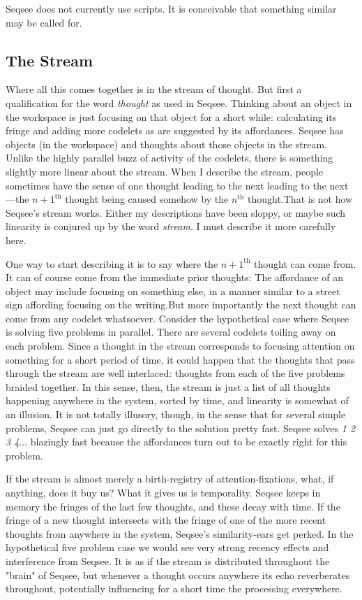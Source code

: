 \documentclass[letterpaper]{article}
\begin{document}
Seqsee does not currently use scripts.  It is conceivable that something similar may be called for. 

\subsection{The Stream}
\label{sec:stream}

Where all this comes together is in the stream of thought. But first a qualification for the word \emph{thought} as used in Seqsee. Thinking about an object in the workspace is just focusing on that object for a short while: calculating its fringe and adding more codelets as are suggested by its affordances. Seqsee has objects (in the workspace) and thoughts about those objects in the stream.  Unlike the highly parallel buzz of activity of the codelets, there is something slightly more linear about the stream.  When I describe the stream, people sometimes have the sense of one thought leading to the next leading to the next---the $n+1^{\mathrm{th}}$ thought being caused somehow by the $n^\mathrm{th}$ thought.That is not how Seqsee's stream works. Either my descriptions have been sloppy, or maybe such linearity is conjured up by the word \emph{stream}. I must describe it more carefully here.

One way to start describing it is to say where the $n+1^{\mathrm{th}}$ thought can come from.  It can of course come  from the immediate prior thoughts: The affordance of an object may include focusing on something else, in a manner similar to a street sign affording focusing on the writing.But more importantly the next thought can come from any codelet whatsoever.  Consider the hypothetical case where Seqsee is solving five problems in parallel.  There are several codelets toiling away on each problem.  Since a thought in the stream corresponds to focusing attention on something for a short period of time, it could happen that the thoughts that pass through the stream are well interlaced: thoughts from each of the five problems braided together. In this sense, then, the stream is just a list of all thoughts happening anywhere in the system, sorted by time, and linearity is somewhat of an illusion. It is not totally illusory, though, in the sense that for several simple problems, Seqsee can just go directly to the solution pretty fast. Seqsee solves \emph{1 2 3 4$\ldots$} blazingly fast because the affordances turn out to be exactly right for this problem.

If the stream is almost merely a birth-registry of attention-fixations, what, if anything, does it buy us? What it gives us is temporality.  Seqsee keeps in memory the fringes of the last few thoughts, and these decay with time.  If the fringe of a new thought intersects with the fringe of one of the more recent thoughts from anywhere in the system, Seqsee's similarity-ears get perked.  In the hypothetical five problem case we would see very strong recency effects and interference from Seqsee.  It is as if the stream is distributed throughout the "brain" of Seqsee, but whenever a thought occurs anywhere its echo reverberates throughout, potentially influencing for a short time the processing everywhere.
\end{document}
